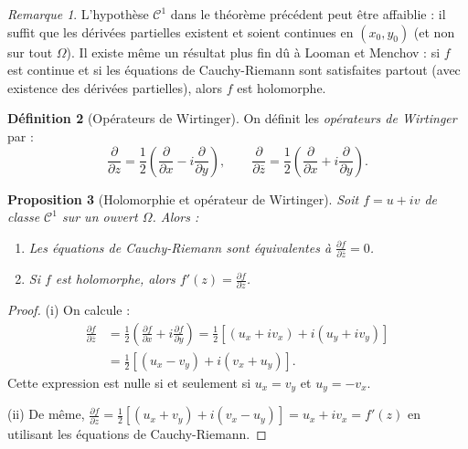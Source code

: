 \documentclass[12pt,a4paper,openany]{book}
\theoremstyle{definition}
\newtheorem{definition}{Définition}[chapter]
\theoremstyle{plain}
\newtheorem{proposition}[definition]{Proposition}
\theoremstyle{remark}
\newtheorem{remarque}[definition]{Remarque}
\newcommand{\conj}[1]{\overline{#1}}
\begin{document}
\begin{remarque}\label{rem:CR-C1-necessaire}
L'hypothèse $\mathscr{C}^1$ dans le théorème précédent peut être affaiblie : il suffit que les dérivées partielles existent et soient continues en $(x_0, y_0)$ (et non sur tout $\Omega$). Il existe même un résultat plus fin dû à Looman et Menchov : si $f$ est continue et si les équations de Cauchy-Riemann sont satisfaites partout (avec existence des dérivées partielles), alors $f$ est holomorphe.
\end{remarque}

\begin{definition}[Opérateurs de Wirtinger]\label{def:wirtinger}
On définit les \emph{opérateurs de Wirtinger} par :
\[
  \frac{\partial}{\partial z} = \frac{1}{2}\left(\frac{\partial}{\partial x} - i\frac{\partial}{\partial y}\right), \qquad
  \frac{\partial}{\partial \conj{z}} = \frac{1}{2}\left(\frac{\partial}{\partial x} + i\frac{\partial}{\partial y}\right).
\]
\end{definition}

\begin{proposition}[Holomorphie et opérateur de Wirtinger]\label{prop:wirtinger-holomorphie}
Soit $f = u + iv$ de classe $\mathscr{C}^1$ sur un ouvert $\Omega$. Alors :
\begin{enumerate}[label=(\roman*)]
  \item Les équations de Cauchy-Riemann sont équivalentes à $\frac{\partial f}{\partial \conj{z}} = 0$.
  \item Si $f$ est holomorphe, alors $f'(z) = \frac{\partial f}{\partial z}$.
\end{enumerate}
\end{proposition}

\begin{proof}
(i) On calcule :
\begin{align*}
  \frac{\partial f}{\partial \conj{z}} &= \frac{1}{2}\left(\frac{\partial f}{\partial x} + i\frac{\partial f}{\partial y}\right) = \frac{1}{2}\left[(u_x + iv_x) + i(u_y + iv_y)\right] \\
  &= \frac{1}{2}\left[(u_x - v_y) + i(v_x + u_y)\right].
\end{align*}
Cette expression est nulle si et seulement si $u_x = v_y$ et $u_y = -v_x$.

(ii) De même, $\frac{\partial f}{\partial z} = \frac{1}{2}[(u_x+v_y) + i(v_x - u_y)] = u_x + iv_x = f'(z)$ en utilisant les équations de Cauchy-Riemann.
\end{proof}
\end{document}

